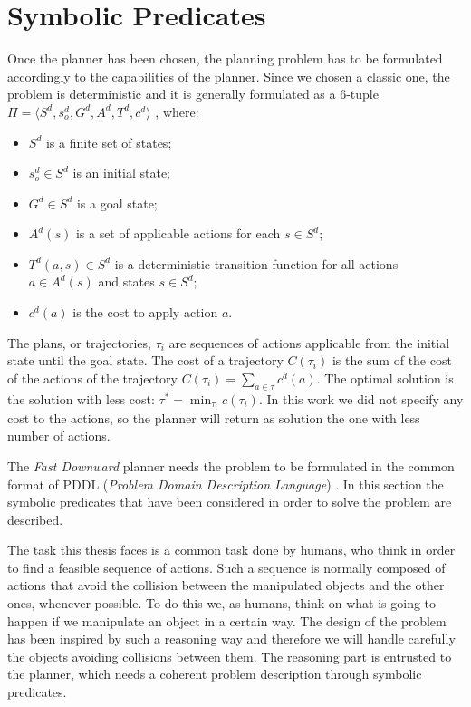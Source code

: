 \section{Symbolic Predicates}
Once the planner has been chosen, the planning problem has to be formulated accordingly to the capabilities of the planner. Since we chosen a classic one, the problem is deterministic and it is generally formulated as a $6$-tuple $\Pi=\langle S^d, s_o^d, G^d, A^d, T^d, c^d \rangle$ \cite{little2007probabilistic}, where:
\begin{itemize}
\item $S^d$ is a finite set of states;
\item $s_o^d \in S^d$ is an initial state;
\item $G^d \in S^d$ is a goal state;
\item $A^d(s)$ is a set of applicable actions for each $s \in S^d$;
\item $T^d(a,s) \in S^d$ is a deterministic transition function for all actions $a \in A^d(s)$ and states $ s \in S^d$;
\item $c^d(a)$ is the cost to apply action $a$. 
\end{itemize}
The plans, or trajectories, $\tau_i$ are sequences of actions applicable from the initial state until the goal state. The cost of a trajectory $C(\tau_i)$ is the sum of the cost of the actions of the trajectory $C(\tau_i) = \sum_{a \in \tau} c^d(a)$. The optimal solution is the solution with less cost: $\tau^* = \min_{\tau_i} c(\tau_i)$.
In this work we did not specify any cost to the actions, so the planner will return as solution the one with less number of actions.

The \textit{Fast Downward} planner needs the problem to be formulated in the common format of PDDL (\textit{Problem Domain Description Language}) \citep{pddl}. In this section the symbolic predicates that have been considered in order to solve the problem are described.

The task this thesis faces is a common task done by humans, who think in order to find a feasible sequence of actions. Such a sequence is normally composed of actions that avoid the collision between the manipulated objects and the other ones, whenever possible. To do this we, as humans, think on what is going to happen if we manipulate an object in a certain way. The design of the problem has been inspired by such a reasoning way and therefore we will handle carefully the objects avoiding collisions between them. The reasoning part is entrusted to the planner, which needs a coherent problem description through symbolic predicates. 

